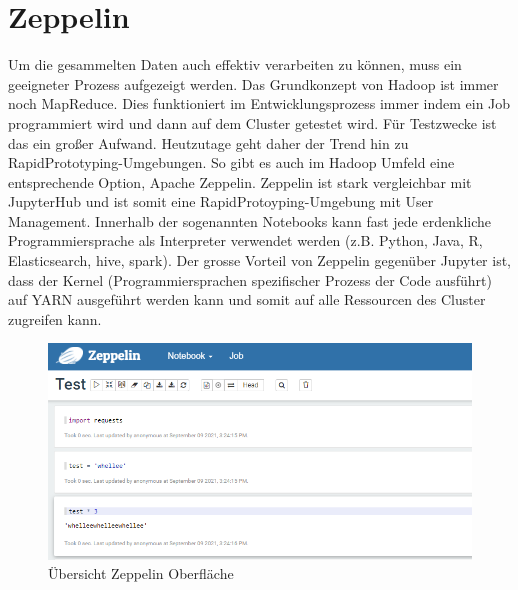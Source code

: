 \documentclass[12pt,oneside,a4paper,parskip]{scrbook}
\begin{document}
\section{Zeppelin}
Um die gesammelten Daten auch effektiv verarbeiten zu k\"onnen, muss ein geeigneter Prozess aufgezeigt werden. Das Grundkonzept von Hadoop ist immer noch MapReduce. Dies funktioniert im Entwicklungsprozess immer indem ein Job programmiert wird und dann auf dem Cluster getestet wird. F\"ur Testzwecke ist das ein großer Aufwand. Heutzutage geht daher  der Trend hin zu RapidPrototyping-Umgebungen. So gibt es auch im Hadoop Umfeld eine entsprechende Option, Apache Zeppelin. Zeppelin ist stark vergleichbar mit JupyterHub und ist somit eine RapidProtoyping-Umgebung mit User Management. Innerhalb der sogenannten Notebooks kann fast jede erdenkliche Programmiersprache als Interpreter verwendet werden (z.B. Python, Java, R, Elasticsearch, hive, spark). Der grosse Vorteil von Zeppelin gegen\"uber Jupyter ist, dass der Kernel (Programmiersprachen spezifischer Prozess der Code ausf\"uhrt) auf YARN ausgef\"uhrt werden kann und somit auf alle Ressourcen des Cluster zugreifen kann.
\begin{figure}[H]
	\centering
	\includegraphics[scale=0.6]{zeppelinOverview.png}
	\captionsetup{justification=centering}
	\caption{\"Ubersicht Zeppelin Oberfl\"ache}
	\label{pic:zeppelinOverview}
\end{figure}
\end{document}
